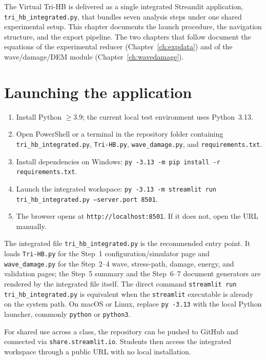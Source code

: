 \documentclass[11pt,a4paper,openany]{book}
\theoremstyle{handbook}
\begin{document}
The Virtual Tri-HB is delivered as a single integrated Streamlit
application, \texttt{tri\_hb\_integrated.py}, that bundles seven analysis
steps under one shared experimental setup. This chapter documents the
launch procedure, the navigation structure, and the export pipeline. The
two chapters that follow document the equations of the experimental
reducer (Chapter~\ref{ch:expdata}) and of the wave/damage/DEM module
(Chapter~\ref{ch:wavedamage}).

\section{Launching the application}

\begin{stepbox}
\begin{enumerate}[leftmargin=*,itemsep=3pt]
  \item Install Python $\ge 3.9$; the current local test environment uses
        Python~3.13.
  \item Open PowerShell or a terminal in the repository folder containing
        \texttt{tri\_hb\_integrated.py}, \texttt{Tri-HB.py},
        \texttt{wave\_damage.py}, and \texttt{requirements.txt}.
  \item Install dependencies on Windows:
        \texttt{py -3.13 -m pip install -r requirements.txt}.
  \item Launch the integrated workspace:
        \texttt{py -3.13 -m streamlit run tri\_hb\_integrated.py --server.port 8501}.
  \item The browser opens at \texttt{http://localhost:8501}. If it does
        not, open the URL manually.
\end{enumerate}
\end{stepbox}

\noindent The integrated file \texttt{tri\_hb\_integrated.py} is the
recommended entry point. It loads \texttt{Tri-HB.py} for the Step~1
configuration/simulator page and \texttt{wave\_damage.py} for the Step~2--4
wave, stress-path, damage, energy, and validation pages; the Step~5 summary
and the Step~6--7 document generators are rendered by the integrated file
itself. The direct command
\texttt{streamlit run tri\_hb\_integrated.py} is equivalent when the
\texttt{streamlit} executable is already on the system path. On macOS or
Linux, replace \texttt{py -3.13} with the local Python launcher, commonly
\texttt{python} or \texttt{python3}.

For shared use across a class, the repository can be pushed to GitHub and
connected via \texttt{share.streamlit.io}. Students then access the
integrated workspace through a public URL with no local installation.
\end{document}
